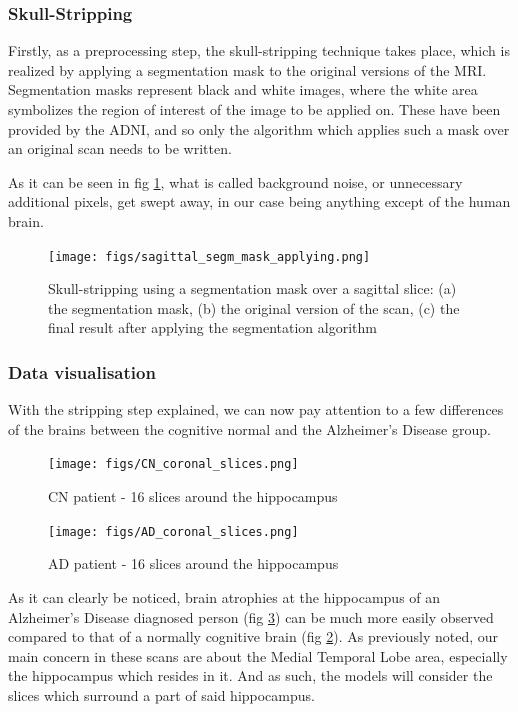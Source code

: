 \documentclass[a4paper, 12pt]{article}
\begin{document}
\subsubsection{Skull-Stripping}

Firstly, as a preprocessing step, the skull-stripping technique takes place, which is realized by applying a segmentation mask
to the original versions of the MRI. Segmentation masks represent black and white images, where the white area symbolizes
the region of interest of the image to be applied on. These have been provided by the ADNI, and so only the algorithm
which applies such a mask over an original scan needs to be written.

As it can be seen in fig \ref{fig:segm-mask}, what is called background noise, or unnecessary additional pixels, get
swept away, in our case being anything except of the human brain.


\begin{figure}[htbp]
    \centering
    \texttt{[image: figs/sagittal\_segm\_mask\_applying.png]}
    \caption{Skull-stripping using a segmentation mask over a sagittal slice: (a) the segmentation mask, (b) the
        original version of the scan, (c) the final result after applying the segmentation algorithm
    }
    \label{fig:segm-mask}
\end{figure}

\subsubsection{Data visualisation}
With the stripping step explained, we can now pay attention to a few differences of the brains between the cognitive normal
and the Alzheimer's Disease group.

\begin{figure}[htbp]
    \centering
    \texttt{[image: figs/CN\_coronal\_slices.png]}
    \caption{CN patient - 16 slices around the hippocampus}
    \label{fig:CN_coronal_slices}
\end{figure}

\begin{figure}[htbp]
    \centering
    \texttt{[image: figs/AD\_coronal\_slices.png]}
    \caption{AD patient - 16 slices around the hippocampus}
    \label{fig:AD_coronal_slices}
\end{figure}

As it can clearly be noticed, brain atrophies at the hippocampus of an Alzheimer's Disease diagnosed person (fig \ref{fig:AD_coronal_slices})
can be much more easily observed compared to that of a normally cognitive brain (fig \ref{fig:CN_coronal_slices}). As previously noted,
our main concern in these scans are about the Medial Temporal Lobe area, especially the hippocampus which resides in it. And as such,
the models will consider the slices which surround a part of said hippocampus.
\end{document}
